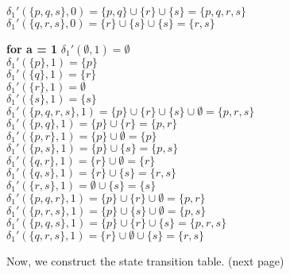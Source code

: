 \documentclass{report}
\begin{document}
{\begin{minipage}[t]{0.5\textwidth}
            $\delta_{1}'(\{ p,q,s \},0) = \{ p,q \} \cup \{ r \} \cup \{ s \} = \{ p,q,r,s \}$\\
            $\delta_{1}'(\{ q,r,s \},0) = \{ r \} \cup \{ s \} \cup \{ s \} = \{ r,s \}$\\
\end{minipage}%
\hfill
\begin{minipage}[t]{0.48\textwidth}
      \textbf{for a = 1}\newline
            $\delta_{1}'(\emptyset,1) = \emptyset$\\
            $\delta_{1}'(\{ p \},1) = \{ p \}$\\
            $\delta_{1}'(\{ q \},1) = \{ r \}$\\
            $\delta_{1}'(\{ r \},1) = \emptyset$\\
            $\delta_{1}'(\{ s \},1) = \{ s \}$\\
            $\delta_{1}'(\{ p,q,r,s \},1) = \{ p \} \cup \{ r \} \cup \{ s \} \cup \emptyset = \{ p,r,s \}$\\
            $\delta_{1}'(\{ p,q \},1) = \{ p \} \cup \{ r \} = \{ p,r \}$\\
            $\delta_{1}'(\{ p,r \},1) = \{ p \} \cup \emptyset = \{ p \}$\\
            $\delta_{1}'(\{ p,s \},1) = \{ p \} \cup \{ s \} = \{ p,s \}$\\
            $\delta_{1}'(\{ q,r \},1) = \{ r \} \cup \emptyset = \{ r \}$\\
            $\delta_{1}'(\{ q,s \},1) = \{ r \} \cup \{ s \} = \{ r,s \}$\\
            $\delta_{1}'(\{ r,s \},1) = \emptyset \cup \{ s \} = \{ s \}$\\
            $\delta_{1}'(\{ p,q,r \},1) = \{ p \} \cup \{ r \} \cup \emptyset = \{ p,r \}$\\
            $\delta_{1}'(\{ p,r,s \},1) = \{ p \} \cup \{ s \} \cup \emptyset = \{ p,s \}$\\
            $\delta_{1}'(\{ p,q,s \},1) = \{ p \} \cup \{ r \} \cup \{ s \} = \{ p,r,s \}$\\
            $\delta_{1}'(\{ q,r,s \},1) = \{ r \} \cup \emptyset \cup \{ s \} = \{ r,s \}$\\
\end{minipage}
Now, we construct the state transition table. (next page)
\pagebreak

}
\end{document}
